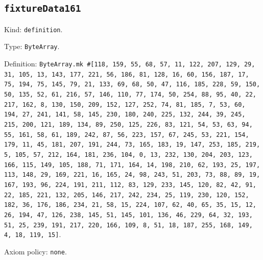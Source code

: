 \documentclass[11pt]{article}
\begin{document}
\subsection*{\texttt{fixtureData161}}
\noindent Kind: \texttt{definition}.\par
\noindent Type: \texttt{ByteArray}.\par
\noindent Definition: \texttt{ByteArray.mk \#[118, 159, 55, 68, 57, 11, 122, 207, 129, 29, 31, 105, 13, 143, 177, 221, 56, 186, 81, 128, 16, 60, 156, 187, 17, 75, 194, 75, 145, 79, 21, 133, 69, 68, 50, 47, 116, 185, 228, 59, 150, 50, 135, 52, 61, 216, 57, 146, 110, 77, 174, 50, 254, 88, 95, 40, 22, 217, 162, 8, 130, 150, 209, 152, 127, 252, 74, 81, 185, 7, 53, 60, 194, 27, 241, 141, 58, 145, 230, 180, 240, 225, 132, 244, 39, 245, 215, 200, 121, 189, 134, 89, 250, 125, 226, 83, 121, 54, 53, 63, 94, 55, 161, 58, 61, 189, 242, 87, 56, 223, 157, 67, 245, 53, 221, 154, 179, 11, 45, 181, 207, 191, 244, 73, 165, 183, 19, 147, 253, 185, 219, 5, 105, 57, 212, 164, 181, 236, 104, 0, 13, 232, 130, 204, 203, 123, 166, 115, 149, 105, 188, 71, 171, 164, 14, 198, 210, 62, 193, 25, 197, 113, 148, 29, 169, 221, 16, 165, 24, 98, 243, 51, 203, 73, 88, 89, 19, 167, 193, 96, 224, 191, 211, 112, 83, 129, 233, 145, 120, 82, 42, 91, 22, 185, 221, 132, 205, 146, 217, 242, 234, 25, 119, 230, 120, 152, 182, 36, 176, 186, 234, 21, 58, 15, 224, 107, 62, 40, 65, 35, 15, 12, 26, 194, 47, 126, 238, 145, 51, 145, 101, 136, 46, 229, 64, 32, 193, 51, 25, 239, 191, 217, 220, 166, 109, 8, 51, 18, 187, 255, 168, 149, 4, 18, 119, 15]}.\par
\noindent Axiom policy: \texttt{none}.\par
\end{document}
